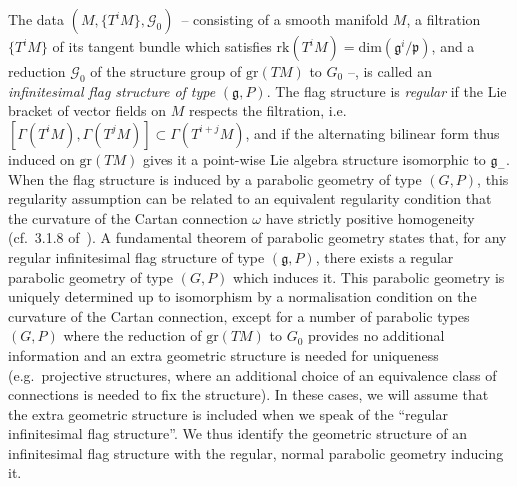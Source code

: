 \documentclass[pdftex]{sigma}
\def\g{\mathfrak{g}}
\def\p{\mathfrak{p}}
\def\Gbdle{\mathcal{G}}
\theoremstyle{plain}
\theoremstyle{definition}
\begin{document}
The data $(M,\{T^iM\},\Gbdle_0)$~-- consisting of a smooth manifold $M$, a f\/iltration $\{T^iM\}$ of its tangent bundle which satisf\/ies $\mathrm{rk}(T^iM) = \mathrm{dim}(\g^i/\p)$, and a reduction $\Gbdle_0$ of the structure group of $\mathrm{gr}(TM)$ to $G_0$ --, is called an \emph{infinitesimal flag structure of type} $(\g,P)$. The f\/lag structure is \emph{regular} if the Lie bracket of vector f\/ields on $M$ respects the f\/iltration, i.e.\ $[\Gamma(T^iM),\Gamma(T^jM)] \subset \Gamma(T^{i+j}M)$, and if the alternating bilinear form thus induced on $\mathrm{gr}(TM)$ gives it a point-wise Lie algebra structure isomorphic to $\g_-$. When the f\/lag structure is induced by a parabolic geometry of type $(G,P)$, this regularity assumption can be related to an equivalent regularity condition that the curvature of the Cartan connection $\omega$ have strictly positive homogeneity (cf.~3.1.8 of~\cite{CSbook}). A fundamental theorem of parabolic geometry states that, for any regular inf\/initesimal f\/lag structure of type $(\g,P)$, there exists a regular parabolic geometry of type $(G,P)$ which induces it. This parabolic geometry is uniquely determined up to isomorphism by a normalisation condition on the curvature of the Cartan connection, except for a number of parabolic types $(G,P)$ where the reduction of $\mathrm{gr}(TM)$ to $G_0$ provides no additional information and an extra geometric structure is needed for uniqueness (e.g.\ projective structures, where an additional choice of an equivalence class of connections is needed to f\/ix the structure). In these cases, we will assume that the extra geometric structure is included when we speak of the ``regular inf\/initesimal f\/lag structure''. We thus identify the geometric structure of an inf\/initesimal f\/lag structure with the regular, normal parabolic geometry inducing it.
\end{document}
